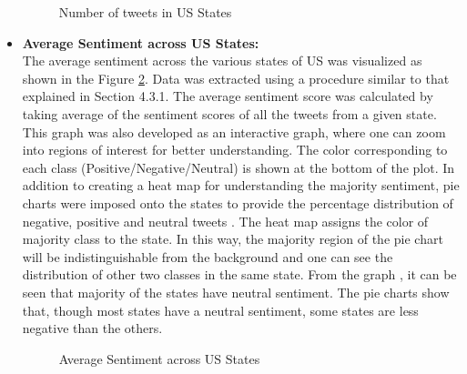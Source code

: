 \documentclass[9pt,twocolumn,twoside]{styles/osajnl}
\begin{document}
\begin{itemize}
\begin{figure}[htbp]
    \caption{Number of tweets in US States}
    \label{fig:ustweet}
    \end{figure}    
    \item \textbf{Average Sentiment across US States:}\\
    The average sentiment across the various states of US was visualized as shown in the Figure \ref{fig:ussenti}. Data was extracted using a procedure similar to that explained in Section 4.3.1. The average sentiment score was calculated by taking average of the sentiment scores of all the tweets from a given state. This graph was also developed as an interactive graph, where one can zoom into regions of interest for better understanding. The color corresponding to each class (Positive/Negative/Neutral) is shown at the bottom of the plot. In addition to creating a heat map for understanding the majority sentiment, pie charts were imposed onto the states to provide the percentage distribution of negative, positive and neutral tweets \cite{www-ussenti}. The heat map assigns the color of majority class to the state. In this way, the majority region of the pie chart will be indistinguishable from the background and one can see the distribution of other two classes in the same state. From the graph , it can be  seen that majority of the states have neutral sentiment. The pie charts show that, though most states have a neutral sentiment, some states are less negative than the others.
    \begin{figure}[htbp]
    \centering
    \caption{Average Sentiment across US States}
    \label{fig:ussenti}
    \end{figure}    
\end{itemize}  
\end{document}
